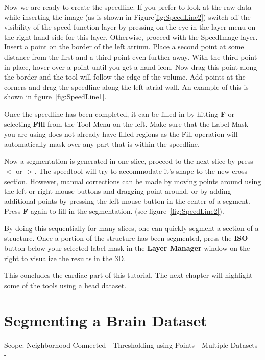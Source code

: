 \documentclass[fleqn,11pt,openany]{book}
\begin{document}
Now we are ready to create the speedline.  If you prefer to look at the raw data while inserting the image (as is shown in Figure\ref{fig:SpeedLine2}) switch off the visibility of the speed function layer by pressing on the eye in the layer menu on the right hand side for this layer.  Otherwise, proceed with the SpeedImage layer.  Insert a point on the border of the left atrium.  Place a second point at some distance from the first and a third point even further away. With the third point in place, hover over a point until you get a hand icon.  Now drag this point along the border and the tool will follow the edge of the volume. Add points at the corners and drag the speedline along the left atrial wall. An example of this is shown in figure~\ref{fig:SpeedLine1}. 

Once the speedline has been completed, it can be filled in by hitting {\bf F} or selecting {\bf Fill} from the Tool Menu on the left. Make sure that the Label Mask you are using does not already have filled regions as the Fill operation will automatically mask over any part that is within the speedline.

Now a segmentation is generated in one slice, proceed to the next slice by press {\bf $<$} or {\bf $>$}. The speedtool will try to accommodate it's shape to the new cross section. However, manual corrections can be made by moving points around using the left or right mouse buttons and dragging point around, or by adding additional points by pressing the left mouse button in the center of a segment. Press {\bf F} again to fill in the segmentation. (see figure~\ref{fig:SpeedLine2}).

By doing this sequentially for many slices, one can quickly segment a section of a structure. Once a portion of the structure has been segmented, press the {\bf ISO \Forward} button below your selected label mask in the {\bf Layer Manager} window on the right to visualize the results in the 3D.

This concludes the cardiac part of this tutorial. The next chapter will highlight some of the tools using a head dataset.


\chapter{Segmenting a Brain Dataset}

\begin{introduction}
Scope: Neighborhood Connected - Thresholding using Points - Multiple Datasets - 
\end{introduction}
\end{document}
